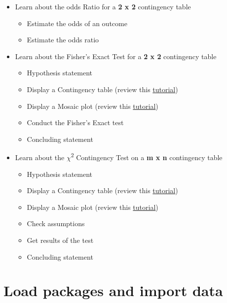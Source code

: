 \documentclass[
]{book}
\providecommand{\tightlist}{%
  \setlength{\itemsep}{0pt}\setlength{\parskip}{0pt}}
\begin{document}
\begin{itemize}
\tightlist
\item
  Learn about the odds Ratio for a \textbf{2 x 2} contingency table

  \begin{itemize}
  \tightlist
  \item
    Estimate the odds of an outcome\\
  \item
    Estimate the odds ratio
  \end{itemize}
\item
  Learn about the Fisher's Exact Test for a \textbf{2 x 2} contingency table

  \begin{itemize}
  \tightlist
  \item
    Hypothesis statement\\
  \item
    Display a Contingency table (review this \hyperref[vis2_cont_table]{tutorial})
  \item
    Display a Mosaic plot (review this \hyperref[mosaic_plot]{tutorial})
  \item
    Conduct the Fisher's Exact test\\
  \item
    Concluding statement
  \end{itemize}
\item
  Learn about the \(\chi\)\textsuperscript{2} Contingency Test on a \textbf{m x n} contingency table

  \begin{itemize}
  \tightlist
  \item
    Hypothesis statement\\
  \item
    Display a Contingency table (review this \hyperref[vis2_cont_table]{tutorial})
  \item
    Display a Mosaic plot (review this \hyperref[mosaic_plot]{tutorial})
  \item
    Check assumptions\\
  \item
    Get results of the test\\
  \item
    Concluding statement
  \end{itemize}
\end{itemize}

\section{Load packages and import data}\label{twocat_packages_data}
\end{document}
